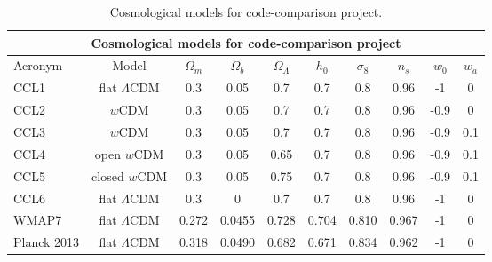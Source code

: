 
\begin{table*}[t]
  \centering
  \begin{tabular}{ l c | c c c c c c c c }
    \hline
    \multicolumn{10}{|c|}{Cosmological models for code-comparison project} \\
    \hline
    \hline
    Acronym & Model & $\Omega_m$ & $\Omega_b$ & $\Omega_\Lambda$ & $h_0$ & $\sigma_8$ & $n_s$ & $w_0$ & $w_a$ \\
    \hline
    CCL1 & flat $\Lambda$CDM & 0.3 & 0.05 & 0.7 & 0.7 & 0.8 & 0.96 & -1 & 0 \\
    CCL2 & $w$CDM & 0.3 & 0.05 & 0.7 & 0.7 & 0.8 & 0.96 & -0.9 & 0  \\
    CCL3 & $w$CDM & 0.3 & 0.05 & 0.7 & 0.7 & 0.8 & 0.96 & -0.9 & 0.1  \\
    CCL4 & open $w$CDM & 0.3 & 0.05 & 0.65 & 0.7 & 0.8 & 0.96 & -0.9 & 0.1  \\
    CCL5 & closed $w$CDM & 0.3 & 0.05 & 0.75 & 0.7 & 0.8 & 0.96 & -0.9 & 0.1  \\
    CCL6 & flat $\Lambda$CDM & 0.3 & 0 & 0.7 & 0.7 & 0.8 & 0.96 & -1 & 0 \\
    WMAP7 & flat $\Lambda$CDM & 0.272 & 0.0455 & 0.728 & 0.704 & 0.810 & 0.967 & -1 & 0 \\
    Planck 2013 & flat $\Lambda$CDM & 0.318 & 0.0490 & 0.682 & 0.671 & 0.834 & 0.962 & -1 & 0 \\
    \hline
  \end{tabular}
  \caption{Cosmological models for code-comparison project.}
  \label{tab:cosmologies}
\end{table*}
